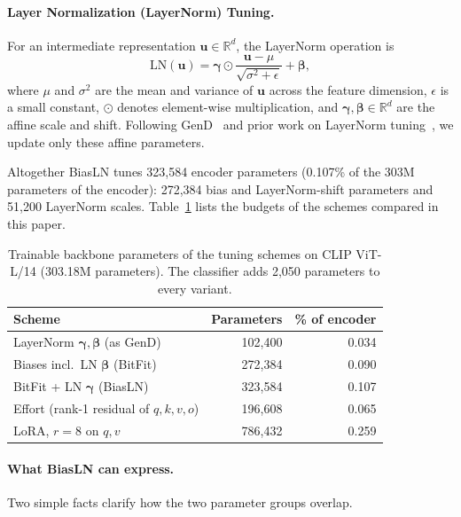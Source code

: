 \documentclass[fonts]{icst}
\begin{document}
\paragraph{Layer Normalization (LayerNorm) Tuning.}
For an intermediate representation $\mathbf{u} \in \mathbb{R}^{d}$, the LayerNorm operation is
\begin{equation}
    \mathrm{LN}(\mathbf{u}) = \boldsymbol{\gamma} \odot \frac{\mathbf{u} - \mu}{\sqrt{\sigma^2 + \epsilon}} + \boldsymbol{\beta},
    \label{eq:ln}
\end{equation}
where $\mu$ and $\sigma^2$ are the mean and variance of $\mathbf{u}$ across the feature dimension, $\epsilon$ is a small constant, $\odot$ denotes element-wise multiplication, and $\boldsymbol{\gamma}, \boldsymbol{\beta} \in \mathbb{R}^{d}$ are the affine scale and shift.
Following GenD~\cite{yermakov2025gend} and prior work on LayerNorm tuning~\cite{wang2022ln,giannou2023layernorm}, we update only these affine parameters.

Altogether BiasLN tunes 323{,}584 encoder parameters (0.107\% of the 303M parameters of the encoder): 272{,}384 bias and LayerNorm-shift parameters and 51{,}200 LayerNorm scales. Table~\ref{tab:budget} lists the budgets of the schemes compared in this paper.

\begin{table}[t]
\centering
\caption{Trainable backbone parameters of the tuning schemes on CLIP ViT-L/14 (303.18M parameters). The classifier adds 2{,}050 parameters to every variant.}
\label{tab:budget}
\footnotesize
\begin{tabular}{l r r}
\toprule
\textbf{Scheme} & \textbf{Parameters} & \textbf{\% of encoder} \\
\midrule
LayerNorm $\boldsymbol{\gamma},\boldsymbol{\beta}$ (as GenD) & 102{,}400 & 0.034 \\
Biases incl.\ LN $\boldsymbol{\beta}$ (BitFit) & 272{,}384 & 0.090 \\
BitFit + LN $\boldsymbol{\gamma}$ (BiasLN) & 323{,}584 & 0.107 \\
Effort (rank-1 residual of $q,k,v,o$) & 196{,}608 & 0.065 \\
LoRA, $r{=}8$ on $q,v$ & 786{,}432 & 0.259 \\
\bottomrule
\end{tabular}
\end{table}

\paragraph{What BiasLN can express.}
\label{sec:analysis}
Two simple facts clarify how the two parameter groups overlap.
\end{document}
